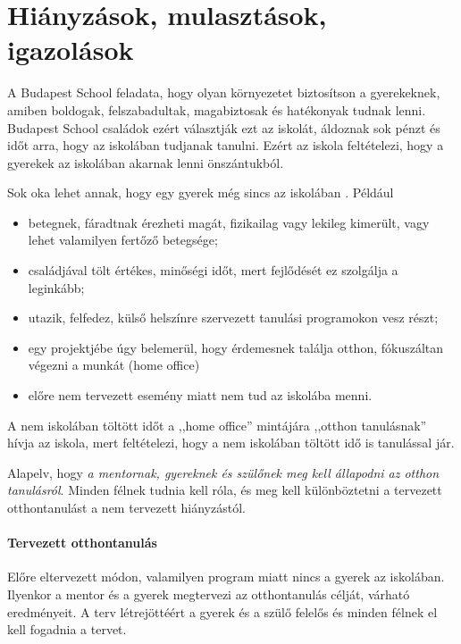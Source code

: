 \section{Hiányzások, mulasztások, igazolások}
A Budapest School feladata, hogy olyan környezetet biztosítson a gyerekeknek, amiben boldogak, felszabadultak, magabiztosak és hatékonyak tudnak lenni. Budapest School családok ezért választják ezt az iskolát, áldoznak sok pénzt és időt arra, hogy az iskolában tudjanak tanulni. Ezért az iskola feltételezi, hogy a gyerekek az iskolában akarnak lenni önszántukból.

Sok oka lehet annak, hogy egy gyerek még sincs az iskolában . Például
\begin{itemize}
    \item betegnek, fáradtnak érezheti magát, fizikailag vagy lekileg kimerült, vagy lehet valamilyen fertőző betegsége;
    \item családjával tölt értékes, minőségi időt, mert fejlődését ez szolgálja a leginkább;
    \item utazik, felfedez, külső helszínre szervezett tanulási programokon vesz részt;
    \item egy projektjébe úgy belemerül, hogy érdemesnek találja otthon, fókuszáltan végezni a munkát (home office)
    \item előre nem tervezett esemény miatt nem tud az iskolába menni.
\end{itemize}

A nem iskolában töltött időt a ,,home office'' mintájára ,,otthon tanulásnak'' hívja az iskola, mert feltételezi, hogy a nem iskolában töltött idő is tanulással jár.

Alapelv, hogy \emph{a mentornak, gyereknek és szülőnek meg kell állapodni az otthon tanulásról}. Minden félnek tudnia kell róla, és meg kell különböztetni a tervezett otthontanulást a nem tervezett hiányzástól.

\paragraph{Tervezett otthontanulás} Előre eltervezett módon, valamilyen program miatt nincs a gyerek az iskolában. Ilyenkor a mentor és a gyerek megtervezi az otthontanulás célját, várható eredményeit. A terv létrejöttéért a gyerek és a szülő felelős és minden félnek el kell fogadnia a tervet.

